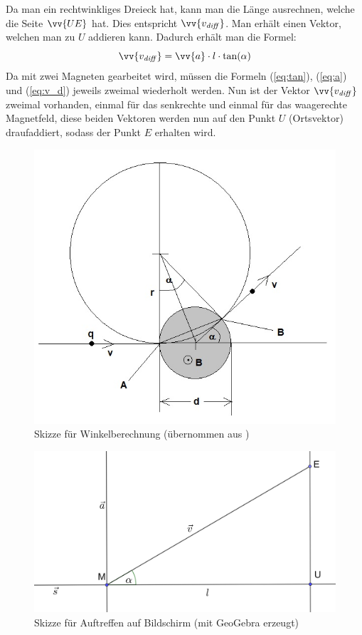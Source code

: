 Da man ein rechtwinkliges Dreieck hat, kann man die Länge ausrechnen, welche die Seite $\vv{UE}$ hat.
Dies entspricht $\vv{v_\mathit{diff}}$.
Man erhält einen Vektor, welchen man zu $U$ addieren kann.
Dadurch erhält man die Formel:
\begin{equation}
    \label{eq:v_d}
    \vv{v_\mathit{diff}} =  \vv{a} \cdot l \cdot \tan(\alpha)
\end{equation}
Da mit zwei Magneten gearbeitet wird, müssen die Formeln (\ref{eq:tan}), (\ref{eq:a}) und (\ref{eq:v_d}) jeweils zweimal wiederholt werden.
Nun ist der Vektor $\vv{v_\mathit{diff}}$ zweimal vorhanden, einmal für das senkrechte und einmal für das waagerechte Magnetfeld, diese beiden Vektoren werden nun auf den Punkt $U$ (Ortsvektor) draufaddiert, sodass der Punkt $E$ erhalten wird.
\begin{figure}
    \centering
    \includegraphics[width=.75\textwidth]{fig/elektronenstrahl-ablenkung_101.jpg}
    \caption{Skizze für Winkelberechnung (übernommen aus \cite{Blog})}
    \label{fig:ausBlog}
\end{figure}

\begin{figure}
    \centering
    \includegraphics[width=.75\textwidth]{fig/Bildschirm_Skizze.png}
    \caption{Skizze für Auftreffen auf Bildschirm (mit GeoGebra erzeugt)}
    \label{fig:Schirm}
\end{figure}

